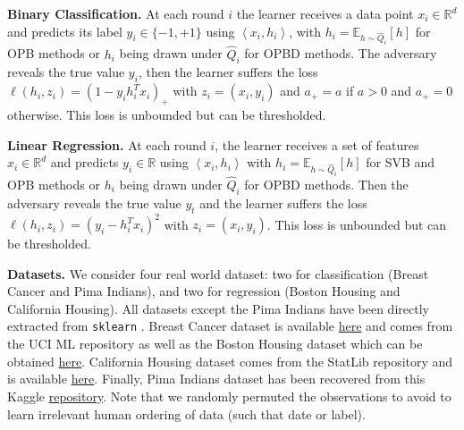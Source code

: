 \textbf{Binary Classification.} At each round $i$ the learner receives a data point $x_{i} \in \mathbb{R}^{d}$ and predicts its label $y_{i} \in\{-1,+1\}$ using $\left\langle x_{i}, h_{i}\right\rangle$, with $h_i= \mathbb{E}_{h\sim \hat{Q}_i}[h]$ for OPB methods or $h_i$ being drawn under $\hat{Q}_i$ for OPBD methods.
The adversary reveals the true value $y_{i}$, then the learner suffers the loss $\ell(h_i,z_i)=\left(1-y_{i} h_{i}^{T} x_{i}\right)_{+}$ with $z_i=(x_i,y_i)$ and $a_{+}=a$ if $a>0$ and $a_{+}=0$ otherwise. This loss is unbounded but can be thresholded.


\textbf{Linear Regression.} At each round $i$, the learner receives a set of features $x_{i} \in \mathbb{R}^{d}$ and predicts $y_{i} \in \mathbb{R}$ using $\left\langle x_{i}, h_{i}\right\rangle$ with $h_i= \mathbb{E}_{h\sim \hat{Q}_i}[h]$ for SVB and OPB methods or $h_i$ being drawn under $\hat{Q}_i$ for OPBD methods.
Then the adversary reveals the true value $y_{t}$ and the learner suffers the loss $\ell(h_i,z_i)=\left(y_{i}-h_{i}^{T} x_{i}\right)^{2}$ with $z_i=(x_i,y_i)$. This loss is unbounded but can be thresholded.

\textbf{Datasets.} We consider four real world dataset: two for classification (Breast Cancer and Pima Indians), and two for regression (Boston Housing and California Housing). All datasets except the Pima Indians have been directly extracted from \texttt{sklearn} \citep{pedregosa2011scikit}.
Breast Cancer dataset \citep{street1993nuclear} is available \href{https://archive.ics.uci.edu/ml/datasets/Breast+Cancer+Wisconsin+(Diagnostic)}{here} and comes from the UCI ML repository  as well as the Boston Housing dataset \citep{belsley2005regression} which can be obtained \href{https://archive.ics.uci.edu/ml/machine-learning-databases/housing/}{here}. California Housing dataset \citep{pace1997sparse} comes from the StatLib repository and is available \href{https://www.dcc.fc.up.pt/~ltorgo/Regression/cal_housing.html}{here}.
Finally, Pima Indians dataset \citep{smith1988using} has been recovered from this Kaggle \href{https://www.kaggle.com/datasets/uciml/pima-indians-diabetes-database}{repository}.  Note that we randomly permuted the observations to avoid to learn irrelevant human ordering of data (such that date or label).


